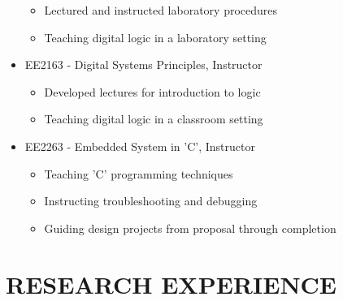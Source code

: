 \documentclass[line]{res} %
\begin{document}
\begin{resume}
\begin{itemize}
\begin{itemize}
\item Lectured and instructed laboratory procedures
\item Teaching digital logic in a laboratory setting
\end{itemize}
\item EE2163 - Digital Systems Principles, Instructor
\begin{itemize}
\item Developed lectures for introduction to logic
\item Teaching digital logic in a classroom setting
\end{itemize}
\item EE2263 - Embedded System in 'C', Instructor
\begin{itemize}
\item Teaching 'C' programming techniques
\item Instructing troubleshooting and debugging
\item Guiding design projects from proposal through completion
\end{itemize}
\end{itemize}

\vspace{8pt} %
\vspace{0.2in} %

\section{RESEARCH EXPERIENCE}
\vspace{.3in} %


\end{resume}
\end{document}
